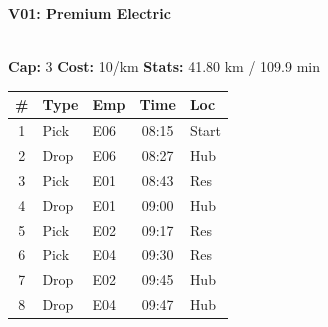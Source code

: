 \documentclass[a4paper,11pt]{article}
\begin{document}
\noindent
\begin{minipage}[t]{0.49\textwidth}
    \centering
    \colorbox{velorablue}{\parbox{\dimexpr\linewidth-2\fboxsep}{\centering \color{white}\large\textbf{V01: Premium Electric}}} \\
    \vspace{0.1cm}
    {\small \textbf{Cap:} 3 \quad \textbf{Cost:} 10/km \quad \textbf{Stats:} 41.80 km / 109.9 min}
    
    \vspace{0.2cm}
    
    \renewcommand{\arraystretch}{1.2}
    \begin{tabular}{c l l c l}
        \toprule
        \textbf{\#} & \textbf{Type} & \textbf{Emp} & \textbf{Time} & \textbf{Loc} \\
        \midrule
        1 & \color{velorablue}Pick & E06 & 08:15 & Start \\
        \rowcolor{headergray} 2 & Drop & E06 & 08:27 & Hub \\
        3 & \color{velorablue}Pick & E01 & 08:43 & Res \\
        \rowcolor{headergray} 4 & Drop & E01 & 09:00 & Hub \\
        5 & \color{velorablue}Pick & E02 & 09:17 & Res \\
        \rowcolor{headergray} 6 & \color{velorablue}Pick & E04 & 09:30 & Res \\
        7 & Drop & E02 & 09:45 & Hub \\
        \rowcolor{headergray} 8 & Drop & E04 & 09:47 & Hub \\
        \bottomrule
    \end{tabular}
\end{minipage}
\hfill
\end{document}
